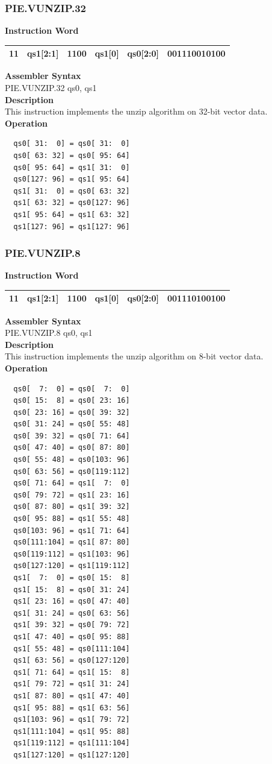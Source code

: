 \newpage
\subsubsection{PIE.VUNZIP.32}\label{instruction:PIEVUNZIP32}
\setlength\tabcolsep{6pt}
\textbf{Instruction Word} \\
\begin{tabular}{|c|c|c|c|c|c|}
	\hline
	11 & qs1[2:1] & 1100 & qs1[0] & qs0[2:0] & 001110010100 \\
	\hline
\end{tabular}

\textbf{Assembler Syntax} \\
PIE.VUNZIP.32 qs0, qs1 \\
\textbf{Description} \\
This instruction implements the unzip algorithm on 32-bit vector data.\\
\textbf{Operation}
\begin{lstlisting}
  qs0[ 31:  0] = qs0[ 31:  0]
  qs0[ 63: 32] = qs0[ 95: 64]
  qs0[ 95: 64] = qs1[ 31:  0]
  qs0[127: 96] = qs1[ 95: 64]
  qs1[ 31:  0] = qs0[ 63: 32]
  qs1[ 63: 32] = qs0[127: 96]
  qs1[ 95: 64] = qs1[ 63: 32]
  qs1[127: 96] = qs1[127: 96]
\end{lstlisting}

\newpage
\subsubsection{PIE.VUNZIP.8}\label{instruction:PIEVUNZIP8}
\setlength\tabcolsep{6pt}
\textbf{Instruction Word} \\
\begin{tabular}{|c|c|c|c|c|c|}
	\hline
	11 & qs1[2:1] & 1100 & qs1[0] & qs0[2:0] & 001110100100 \\
	\hline
\end{tabular}

\textbf{Assembler Syntax} \\
PIE.VUNZIP.8 qs0, qs1 \\
\textbf{Description} \\
This instruction implements the unzip algorithm on 8-bit vector data.\\
\textbf{Operation}
\begin{lstlisting}
  qs0[  7:  0] = qs0[  7:  0]
  qs0[ 15:  8] = qs0[ 23: 16]
  qs0[ 23: 16] = qs0[ 39: 32]
  qs0[ 31: 24] = qs0[ 55: 48]
  qs0[ 39: 32] = qs0[ 71: 64]
  qs0[ 47: 40] = qs0[ 87: 80]
  qs0[ 55: 48] = qs0[103: 96]
  qs0[ 63: 56] = qs0[119:112]
  qs0[ 71: 64] = qs1[  7:  0]
  qs0[ 79: 72] = qs1[ 23: 16]
  qs0[ 87: 80] = qs1[ 39: 32]
  qs0[ 95: 88] = qs1[ 55: 48]
  qs0[103: 96] = qs1[ 71: 64]
  qs0[111:104] = qs1[ 87: 80]
  qs0[119:112] = qs1[103: 96]
  qs0[127:120] = qs1[119:112]
  qs1[  7:  0] = qs0[ 15:  8]
  qs1[ 15:  8] = qs0[ 31: 24]
  qs1[ 23: 16] = qs0[ 47: 40]
  qs1[ 31: 24] = qs0[ 63: 56]
  qs1[ 39: 32] = qs0[ 79: 72]
  qs1[ 47: 40] = qs0[ 95: 88]
  qs1[ 55: 48] = qs0[111:104]
  qs1[ 63: 56] = qs0[127:120]
  qs1[ 71: 64] = qs1[ 15:  8]
  qs1[ 79: 72] = qs1[ 31: 24]
  qs1[ 87: 80] = qs1[ 47: 40]
  qs1[ 95: 88] = qs1[ 63: 56]
  qs1[103: 96] = qs1[ 79: 72]
  qs1[111:104] = qs1[ 95: 88]
  qs1[119:112] = qs1[111:104]
  qs1[127:120] = qs1[127:120]
\end{lstlisting}

